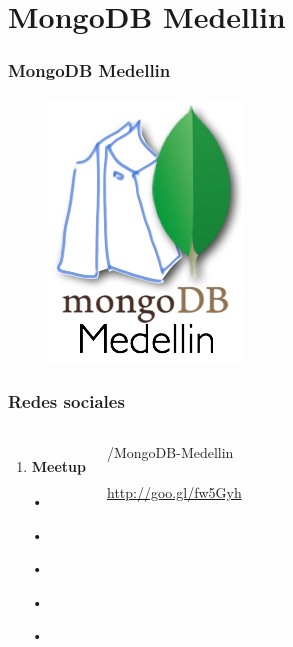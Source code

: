 \documentclass{beamer}
\begin{document}
\section{MongoDB Medellin}
\begin{frame}
\frametitle{MongoDB Medellin}
\begin{figure}
\includegraphics[width=0.3\linewidth]{mongodbmedellin.png}
\end{figure}
\end{frame}
\begin{frame}
\frametitle{Redes sociales}
\begin{columns}[c] %

\begin{enumerate}
\item \textbf{Meetup}
\item[•]	
\item[•]	
\item[•]	
\item[•]	
\item[•]	
\end{enumerate}

{\color{blue}/MongoDB-Medellin}
\\~\\
{\color{blue}\url{http://goo.gl/fw5Gyh}}
\end{columns}
\end{frame}
\end{document}
